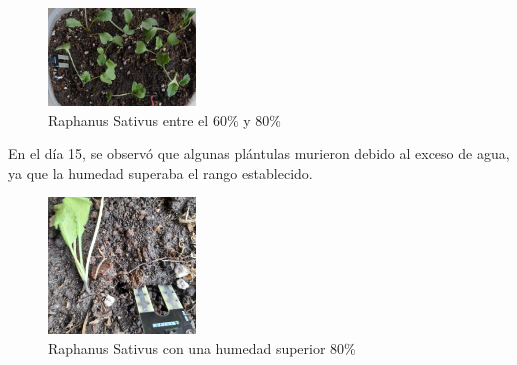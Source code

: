 \documentclass[conference]{IEEEtran}
\begin{document}
	\begin{figure}[h]
		\centering
		\includegraphics[width=0.35\textwidth]{media/Opt 15.jpg}
		\caption{Raphanus Sativus entre el 60\% y 80\%}
		\label{fig:raphanus-humedad-optima}
	\end{figure}
	En el día 15, se observó que algunas plántulas murieron debido al exceso de agua, ya que la humedad superaba el rango establecido. 
	\begin{figure}[h]
		\centering
		\includegraphics[width=0.35\textwidth]{media/H_Mayor.jpg}
		\caption{Raphanus Sativus con una humedad superior 80\%}
		\label{fig:raphanus-humedad-excesiva}
	\end{figure}
	
	
	
	
	
\end{document}
